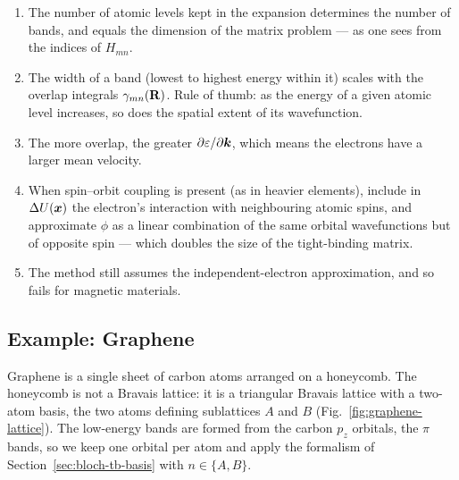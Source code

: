 \begin{enumerate}
    \item The number of atomic levels kept in the expansion determines the number of bands, and equals the dimension of the matrix problem --- as one sees from the indices of $H_{mn}$.
    \item The width of a band (lowest to highest energy within it) scales with the overlap integrals $\gamma_{mn}(\cvect{R})$. Rule of thumb: as the energy of a given atomic level increases, so does the spatial extent of its wavefunction.
    \item The more overlap, the greater $\partial\varepsilon/\partial \bm{k}$, which means the electrons have a larger mean velocity.
    \item When spin--orbit coupling is present (as in heavier elements), include in $\Delta U(\bm{x})$ the electron's interaction with neighbouring atomic spins, and approximate $\phi$ as a linear combination of the same orbital wavefunctions but of opposite spin --- which doubles the size of the tight-binding matrix.
    \item The method still assumes the independent-electron approximation, and so fails for magnetic materials.
\end{enumerate}

\subsection{Example: Graphene}
\label{sec:bloch-graphene}

Graphene is a single sheet of carbon atoms arranged on a honeycomb. The honeycomb is not a Bravais lattice: it is a triangular Bravais lattice with a two-atom basis, the two atoms defining sublattices $A$ and $B$ (Fig.~\ref{fig:graphene-lattice}). The low-energy bands are formed from the carbon $p_z$ orbitals, the $\pi$ bands, so we keep one orbital per atom and apply the formalism of Section~\ref{sec:bloch-tb-basis} with $n\in\{A,B\}$.


